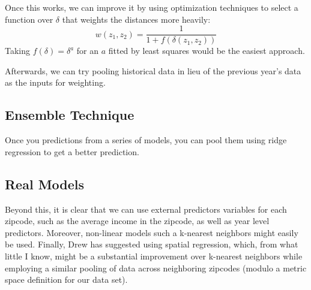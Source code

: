 \documentclass[11pt]{amsart}
\begin{document}
Once this works, we can improve it by using optimization techniques to select a function over $\delta$ that weights the distances more heavily:
\[
w(z_{1}, z_{2}) = \frac{1}{1 + f(\delta(z_{1}, z_{2}))}
\]
Taking $f(\delta) = \delta^a$ for an $a$ fitted by least squares would be the easiest approach.

Afterwards, we can try pooling historical data in lieu of the previous year's data as the inputs for weighting.

\subsection{Ensemble Technique}
Once you predictions from a series of models, you can pool them using ridge regression to get a better prediction.

\subsection{Real Models}
Beyond this, it is clear that we can use external predictors variables for each zipcode, such as the average income in the zipcode, as well as year level predictors. Moreover, non-linear models such a k-nearest neighbors might easily be used. Finally, Drew has suggested using spatial regression, which, from what little I know, might be a substantial improvement over k-nearest neighbors while employing a similar pooling of data across neighboring zipcodes (modulo a metric space definition for our data set).
\end{document}
